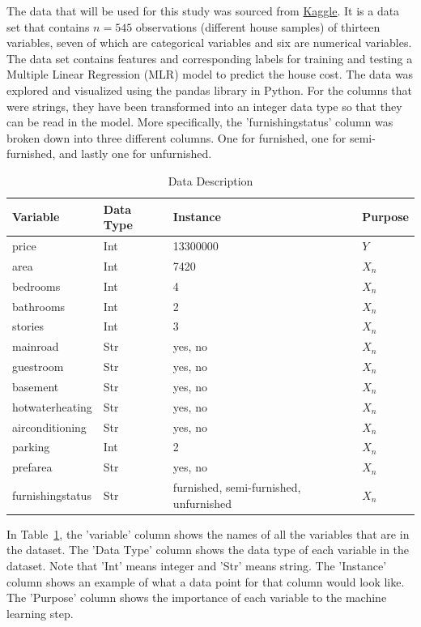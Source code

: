 \documentclass[12pt]{article}
\begin{document}

The data that will be used for this study was sourced from \href{https://www.kaggle.com/code/ashydv/housing-price-prediction-linear-regression/input}{Kaggle}. It is a data set that contains \(n = 545\) observations (different house samples) of thirteen variables, seven of which are categorical variables and six are numerical variables. The data set contains features and corresponding labels for training and testing a Multiple Linear Regression (MLR) model to predict the house cost.
The data was explored and visualized using the pandas library in Python. For the columns that were strings, they have been transformed into an integer data type so that they can be read in the model. More specifically, the 'furnishingstatus' column was broken down into three different columns. One for furnished, one for semi-furnished, and lastly one for unfurnished. 


\begin{table}
\caption{Data Description}
  \label{tab:rv}
\begin{tabular}{llll}
  \toprule
Variable & Data Type & Instance & Purpose \\
  \midrule
price & Int & 13300000 & \(Y\) \\ 
area & Int & 7420 & \(X_{n}\) \\ 
bedrooms & Int & 4 & \(X_{n}\) \\ 
bathrooms & Int & 2 & \(X_{n}\) \\ 
stories & Int & 3 & \(X_{n}\) \\ 
mainroad & Str & yes, no & \(X_{n}\) \\
guestroom & Str & yes, no & \(X_{n}\) \\
basement & Str & yes, no & \(X_{n}\) \\
hotwaterheating & Str & yes, no & \(X_{n}\) \\
airconditioning & Str & yes, no & \(X_{n}\) \\
parking & Int & 2 & \(X_{n}\) \\
prefarea & Str & yes, no & \(X_{n}\) \\
furnishingstatus & Str & furnished, semi-furnished, unfurnished & \(X_{n}\) \\
   \bottomrule
\end{tabular}\par
\bigskip
In Table~\ref{tab:rv}, the 'variable' column shows the names of all the variables that are in the dataset. The 'Data Type' column shows the data type of each variable in the dataset. Note that 'Int' means integer and 'Str' means string. The 'Instance' column shows an example of what a data point for that column would look like. The 'Purpose' column shows the importance of each variable to the machine learning step.
\end{table}
\end{document}
